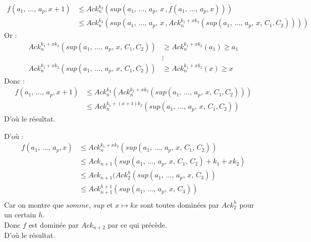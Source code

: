 \documentclass[12pt,letterpaper,boxed]{hmcpset}
\begin{document}
\begin{solution}
\begin{solution}[(d)]
\begin{itemize}
\begin{itemize}[leftmargin=*]
		\begin{align*}
			f(a_{1}, \, \dots , \, a_{p}, x+1) & \leq Ack^{k_{2}}_{n}(sup(a_{1}, \, \dots , \, a_{p}, \, x \, , f(a_{1}, \, \dots , \, a_{p}, x) )) \\
			& \leq Ack^{k_{2}}_{n}(sup(a_{1}, \, \dots , \, a_{p}, \, x \, , Ack^{k_{1} + xk_{2}}_{n}(sup(a_{1}, \, \dots , \, a_{p},  \, x, \, C_{1}, C_{2})) ))
		\end{align*}
		\noindent Or : 
		\begin{align*}
		Ack^{k_{1} + xk_{2}}_{n}(sup(a_{1}, \, \dots , \, a_{p},  \, x, \, C_{1}, C_{2})) & \geq  Ack^{k_{1} + xk_{2}}_{n}(a_{1}) \geq a_{1} \\
		& \vdots  \\
		Ack^{k_{1} + xk_{2}}_{n}(sup(a_{1}, \, \dots , \, a_{p},  \, x, \, C_{1}, C_{2})) & \geq  Ack^{k_{1} + xk_{2}}_{n}(x) \geq x
		\end{align*}
		Donc :
		\begin{align*}
			f(a_{1}, \, \dots , \, a_{p}, x+1) 
& \leq Ack^{k_{2}}_{n}(Ack^{k_{1} + xk_{2}}_{n}(sup(a_{1}, \, \dots , \, a_{p},  \, x, \, C_{1}, C_{2})) ) \\
		& \leq Ack^{k_{1} + (x+1)k_{2}}_{n}(sup(a_{1}, \, \dots , \, a_{p},  \, x, \, C_{1}, C_{2})) 
		\end{align*}
		D'où le résultat.
	\end{itemize}

\newpage 

\noindent D'où : 
\begin{align*}
f(a_{1}, \, \dots , \, a_{p}, x) & \leq  Ack^{k_{1} + xk_{2}}_{n}(sup(a_{1}, \, \dots , \, a_{p}, \, x, \,  C_{1}, \, C_{2})) \\
& \leq  Ack_{n+1}(sup(a_{1}, \, \dots , \, a_{p}, \, x, \,  C_{1}, \, C_{2})+k_{1} + xk_{2}) \\
& \leq  Ack_{n+1}(Ack^{h}_{2}(sup(a_{1}, \, \dots , \, a_{p}, \, x, \,  C_{3})) \\
& \leq  Ack^{h+1}_{n+1}(sup(a_{1}, \, \dots , \, a_{p}, \, x, \,  C_{3})) \\
\end{align*}
Car on montre que $somme$, $sup$ et $x \mapsto kx$ sont toutes dominées par $Ack^{h}_{2}$ pour un certain $h$. \\
Donc $f$ est dominée par $Ack_{n+2}$ par ce qui précède. \\
D'où le résultat.


\end{itemize}

\end{solution}


\end{solution}
\end{document}
